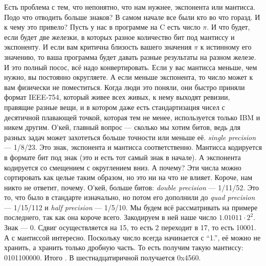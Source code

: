 \documentclass{article}
\begin{document}
    Есть проблема с тем, что непонятно, что нам нужнее, экспонента или мантисса. Подо что отводить больше знаков? В самом начале все были кто во что горазд. И к чему это привело? Пусть у нас в программе на C есть число $\pi$. И что будет, если будет две железки, в которых разное количество бит под мантиссу и экспоненту. И если вам критична близость вашего значения $\pi$ к истинному его значению, то ваша программа будет давать разные результаты на разном железе. И это полный посос, всё надо конвертировать. Если у вас мантисса меньше, чем нужно, вы постоянно округляете. А если меньше экспонента, то число может к вам физически не поместиться. Когда люди это поняли, они быстро приняли формат IEEE-754, который живее всех живых, к нему выходят ревизии, правящие разные вещи, и в котором даже есть стандартизация чисел с десятичной плавающей точкой, которая тем не менее, используется только IBM и никем другим. О'кей, главный вопрос --- сколько мы хотим битов, ведь для разных задач может захотеться больше точности или меньше её. \textit{single precision} --- 1/8/23. Это знак, экспонента и мантисса соответственно. Мантисса кодируется в формате бит под знак (это и есть тот самый знак в начале). А экспонента кодируется со смещением с округлением вниз. А почему? Эти числа можно сортировать как целые таким образом, но это ни на что не влияет. Короче, нам никто не ответит, почему. О'кей, больше битов: \textit{double precision} --- 1/11/52. Это то, что было в стандарте изначально, но потом его дополнили до \textit{quad precision} --- 1/15/112 и \textit{half precision} --- 1/5/10. Мы будем всё рассматривать на примере последнего, так как она короче всего. Закодируем в ней наше число $1.01011\cdot2^2$. Знак --- 0. Сдвиг осуществляется на 15, то есть 2 переходит в 17, то есть 10001. А с мантиссой интересно. Поскольку число всегда начинается с ``1.'', её можно не хранить, а хранить только дробную часть. То есть получим такую мантиссу: 0101100000. Итого . В шестнадцатиричной получается 0x4560.\\
\end{document}
